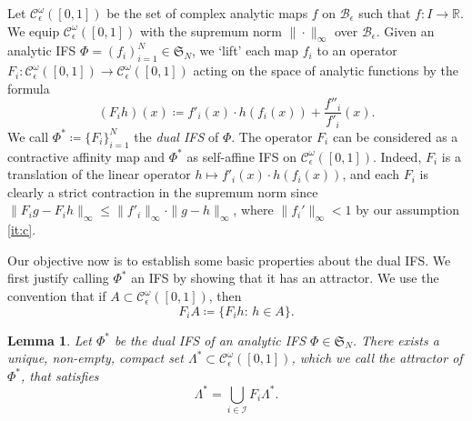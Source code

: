 \documentclass[11pt,]{article}
\def\cref#1{\ref{#1}}%
\newtheorem{lemma}[theorem]{Lemma}
\theoremstyle{definition}
\theoremstyle{remark}
\newcommand{\0}{\mathbf{0}}
\begin{document}
Let $\mathcal{C}_\epsilon^\omega([0,1])$ be the set of complex analytic maps $f$ on
$\mathcal{B}_{\epsilon}$ such that $f\colon I \to \mathbb{R}$. We equip $\mathcal{C}_\epsilon^\omega([0,1])$ with the supremum norm $\|\cdot\|_\infty$ over $\mathcal{B}_\epsilon$. Given an analytic IFS $\Phi=(f_i)_{i=1}^N\in\mathfrak{S}_N$, we `lift' each map $f_i$ to an operator $F_i:
\mathcal{C}^{\omega}_\epsilon([0,1]) \to \mathcal{C}_\epsilon^{\omega}([0,1])$ acting on the space of analytic
functions by the formula
\begin{equation}\label{eq:LiftedIFS}
	(F_i h)(x)\coloneqq f'_i(x)\cdot h(f_i(x)) + \frac{f''_i}{f'_i}(x).
\end{equation}
We call $\Phi^*\coloneqq\{F_i\}_{i=1}^N$ the \emph{dual IFS} of $\Phi$. The operator $F_i$ can be
considered as a contractive affinity map and $\Phi^*$ as self-affine IFS on $\mathcal{C}_\epsilon^\omega([0,1])$.
Indeed, $F_i$ is a translation of the linear operator $h\mapsto f'_i(x)\cdot h(f_i(x))$, and each $F_i$ is clearly a
strict contraction in the supremum norm since $\|F_ig-F_ih\|_{\infty}\leq \|f'_i\|_{\infty}\cdot\|g-h\|_{\infty}$, where $\|f_i'\|_\infty<1$ by our assumption \cref{it:c}.

Our objective now is to establish some basic properties about the dual IFS. We first justify calling $\Phi^*$ an IFS by showing that it has an
attractor. We use the convention that if $A\subset \mathcal{C}^{\omega}_\epsilon([0,1])$, then
\begin{equation*}
	F_iA \coloneqq \{F_i h:\, h\in A\}.
\end{equation*}
\begin{lemma}\label{lem:ExistanceAttractor}
	Let $\Phi^*$ be the dual IFS of an analytic IFS $\Phi\in\mathfrak{S}_N$. There exists a unique, non-empty,
	compact set $\Lambda^*\subset \mathcal{C}^{\omega}_\epsilon([0,1])$, which we call the \emph{attractor} of
	$\Phi^*$, that satisfies
	\begin{equation*}
		\Lambda^*=\bigcup_{i\in\mathcal{I}} F_i\Lambda^*.
	\end{equation*} 
\end{lemma} 
\end{document}
